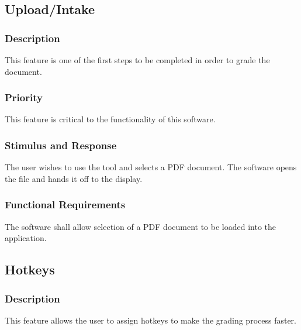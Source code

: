 \subsection{Upload/Intake}
\subsubsection{Description}
This feature is one of the first steps to be completed in order to grade the document.

\subsubsection{Priority}
This feature is critical to the functionality of this software.

\subsubsection{Stimulus and Response}
The user wishes to use the tool and selects a PDF document. The software opens the file and hands it off to the display.

\subsubsection{Functional Requirements}
The software shall allow selection of a PDF document to be loaded into the application.


\subsection{Hotkeys}
\subsubsection{Description}
This feature allows the user to assign hotkeys to make the grading process faster. 

